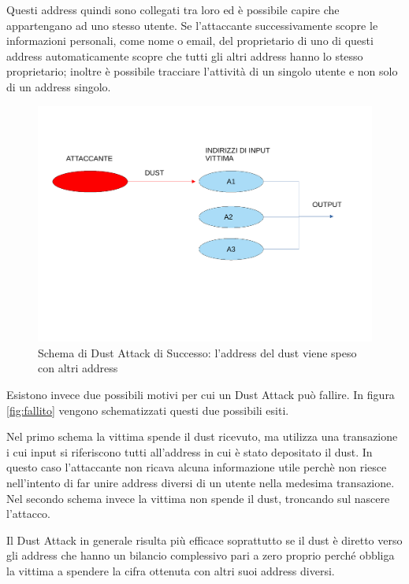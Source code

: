 Questi address quindi sono collegati tra loro ed è possibile capire che appartengano ad uno stesso utente. Se l'attaccante successivamente scopre le informazioni personali, come nome o email, del proprietario di uno di questi address automaticamente scopre che tutti gli altri address hanno lo stesso proprietario; inoltre è possibile tracciare l'attività di un singolo utente e non solo di un address singolo.
\begin{figure}[h!]
    \centering
    \includegraphics[scale=0.5,trim = 1cm 6cm 0cm 3cm, clip]{Images/successo.pdf}
    \caption{Schema di Dust Attack di Successo: l'address del dust viene speso con altri address}
    \label{fig:success}
\end{figure}
\FloatBarrier
Esistono invece due possibili motivi per cui un Dust Attack può fallire. In figura \ref{fig:fallito} vengono schematizzati questi due possibili esiti.

Nel primo schema la vittima spende il dust ricevuto, ma utilizza una transazione i cui input si riferiscono tutti all'address in cui è stato depositato il dust. In questo caso l'attaccante non ricava alcuna informazione utile perchè non riesce nell'intento di far unire address diversi di un utente nella medesima transazione. Nel secondo schema invece la vittima non spende il dust, troncando sul nascere l'attacco. 

Il Dust Attack in generale risulta più efficace soprattutto se il dust è diretto verso gli address che hanno un bilancio complessivo pari a zero proprio perché obbliga la vittima a spendere la cifra ottenuta con altri suoi address diversi.

